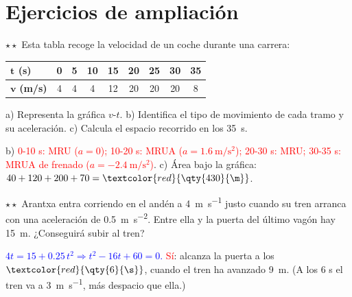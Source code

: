 \section{Ejercicios de ampliación}\label{sec:ud9-ampliacion}

\begin{exercise}
    \(\star\star\) Esta tabla recoge la velocidad de un coche durante una carrera:
    \begin{center}
        \begin{tabular}{@{}lcccccccc@{}}
            \toprule
            \(\boldsymbol{t}\) \textbf{(s)} & 0 & 5 & 10 & 15 & 20 & 25 & 30 & 35 \\
            \midrule
            \(\boldsymbol{v}\) \textbf{(m/s)} & 4 & 4 & 4 & 12 & 20 & 20 & 20 & 8 \\
            \bottomrule
        \end{tabular}
    \end{center}
    a) Representa la gráfica \(v\)-\(t\). b) Identifica el tipo de movimiento de cada tramo y su aceleración. c) Calcula el espacio
    recorrido en los \qty{35}{\s}.
    \begin{solu}
        b) \textcolor{red}{0-10 s: MRU (\(a = 0\)); 10-20 s: MRUA (\(a = \qty{1.6}{\m\per\s\squared}\)); 20-30 s: MRU; 30-35 s: MRUA de
        frenado (\(a = \qty{-2.4}{\m\per\s\squared}\))}. c) Área bajo la gráfica: \(40 + 120 + 200 + 70 = \textcolor{red}{\qty{430}{\m}}\).
    \end{solu}
\end{exercise}

\begin{exercise}
    \(\star\star\) Arantxa entra corriendo en el andén a \qty{4}{\m\per\s} justo cuando su tren arranca con una aceleración de
    \qty{0.5}{\m\per\s\squared}. Entre ella y la puerta del último vagón hay \qty{15}{\m}. ¿Conseguirá subir al tren?
    \begin{solu}
        \textcolor{blue}{\(4t = 15 + \num{0.25}\,t^2 \Rightarrow t^2 - 16t + 60 = 0\).} \textcolor{red}{Sí}: alcanza la puerta a los
        \(\textcolor{red}{\qty{6}{\s}}\), cuando el tren ha avanzado \qty{9}{\m}. (A los 6 s el tren va a \qty{3}{\m\per\s}, más
        despacio que ella.)
    \end{solu}
\end{exercise}

